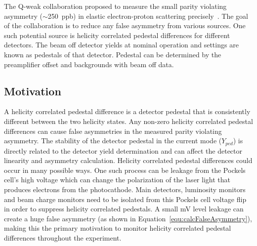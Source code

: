 The Q-weak collaboration proposed to measure the small parity violating asymmetry ($\sim$250~ppb) in elastic electron-proton scattering precisely~\cite{qweak_proposal_2007}. The goal of the collaboration is to reduce any false asymmetry from various sources. One such potential source is helicity correlated pedestal differences for different detectors. The beam off detector yields at nominal operation and settings are known as pedestals of that detector. Pedestal can be determined by the preamplifier offset and backgrounds with beam off data. 

\subsection{Motivation}
\label{Motivation}
A helicity correlated pedestal difference is a detector pedestal that is consistently different between the two helicity states. Any non-zero helicity correlated pedestal differences can cause false asymmetries in the measured parity violating asymmetry. The stability of the detector pedestal in the current mode ($Y_{ped}$) is directly related to the detector yield determination and can affect the detector linearity and asymmetry calculation. 
Helicity correlated pedestal differences could occur in many possible ways. One such process can be leakage from the Pockels cell's high voltage which can change the polarization of the laser light that produces electrons from the photocathode. Main detectors, luminosity monitors and beam charge monitors need to be isolated from this Pockels cell voltage flip in order to suppress helicity correlated pedestals. A small mV level leakage can create a huge false asymmetry (as shown in Equation~\ref{equ:calcFalseAsymmetry}), making this the primary motivation to monitor helicity correlated pedestal differences throughout the experiment.

